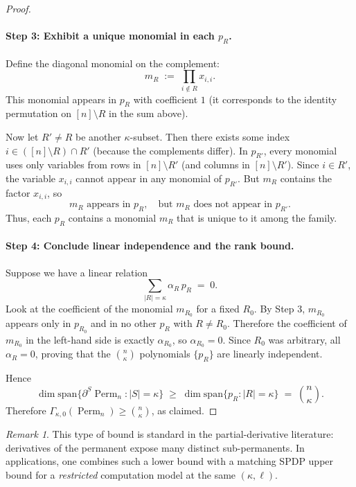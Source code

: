 \documentclass[12pt]{article}
\theoremstyle{definition}
\theoremstyle{remark}
\newtheorem{remark}[theorem]{Remark}
\DeclareMathOperator{\Perm}{Perm}
\begin{document}
\begin{proof}
\paragraph{Step 3: Exhibit a unique monomial in each $p_R$.}
Define the diagonal monomial on the complement:
\[
m_R \;:=\; \prod_{i\notin R} x_{i,i}.
\]
This monomial appears in $p_R$ with coefficient $1$ (it corresponds to the
identity permutation on $[n]\setminus R$ in the sum above).

Now let $R'\neq R$ be another $\kappa$-subset. Then there exists some index
$i\in([n]\setminus R)\cap R'$ (because the complements differ).
In $p_{R'}$, every monomial uses only variables from rows in $[n]\setminus R'$
(and columns in $[n]\setminus R'$). Since $i\in R'$, the variable $x_{i,i}$ cannot
appear in any monomial of $p_{R'}$. But $m_R$ contains the factor $x_{i,i}$, so
\[
m_R \text{ appears in } p_R,\quad \text{but } m_R \text{ does not appear in } p_{R'}.
\]
Thus, each $p_R$ contains a monomial $m_R$ that is unique to it among the family.

\paragraph{Step 4: Conclude linear independence and the rank bound.}
Suppose we have a linear relation
\[
\sum_{|R|=\kappa} \alpha_R\, p_R \;=\; 0.
\]
Look at the coefficient of the monomial $m_{R_0}$ for a fixed $R_0$.
By Step 3, $m_{R_0}$ appears only in $p_{R_0}$ and in no other $p_R$ with $R\neq R_0$.
Therefore the coefficient of $m_{R_0}$ in the left-hand side is exactly $\alpha_{R_0}$,
so $\alpha_{R_0}=0$. Since $R_0$ was arbitrary, all $\alpha_R=0$, proving that the
$\binom{n}{\kappa}$ polynomials $\{p_R\}$ are linearly independent.

Hence
\[
\dim \mathrm{span}\{\partial^S \Perm_n : |S|=\kappa\}
\;\ge\;
\dim \mathrm{span}\{p_R : |R|=\kappa\}
\;=\;
\binom{n}{\kappa}.
\]
Therefore $\Gamma_{\kappa,0}(\Perm_n)\ge \binom{n}{\kappa}$, as claimed.
\end{proof}

\begin{remark}
This type of bound is standard in the partial-derivative literature: derivatives of the
permanent expose many distinct sub-permanents. In applications, one combines such a lower
bound with a matching SPDP upper bound for a \emph{restricted} computation model at the
same $(\kappa,\ell)$.
\end{remark}

\end{document}

